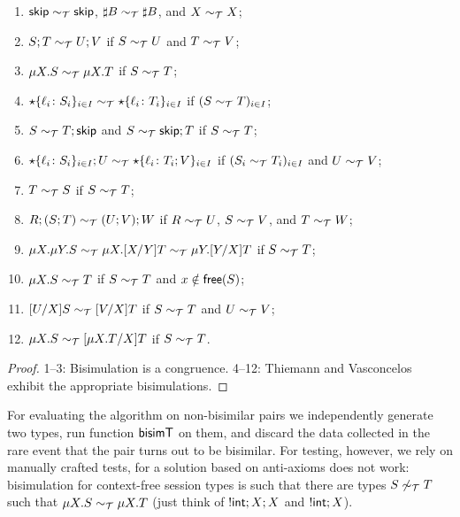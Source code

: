 \begin{theorem}
\label{thm:axioms}
  \begin{enumerate}
  \item $\mathsf{skip} \sim_\mathcal T \mathsf{skip}$,  $\sharp B \sim_\mathcal T \sharp B$, and
    $X \sim_\mathcal T X$;
  \item $S;T \sim_\mathcal T U;V$ if $S \sim_\mathcal T U$ and $T \sim_\mathcal T V$;
  \item $\mu X.S \sim_\mathcal T \mu X.T$ if $S \sim_\mathcal T T$;
  \item $\star\{\ell_i\colon S_i\}_{i\in I}\sim_\mathcal T
    \star\{\ell_i\colon T_i\}_{i\in I}$ if $(S \sim_\mathcal T T)_{i\in
      I}$;
  \item $S\sim_\mathcal T T;\mathsf{skip}$ and $S\sim_\mathcal T \mathsf{skip};T$ if $S \sim_\mathcal T T$;
  \item $\star\{\ell_i\colon S_i\}_{i\in I};U\sim_\mathcal T
    \star\{\ell_i\colon T_i;V\}_{i\in I}$ if $(S_i \sim_\mathcal T T_i)_{i\in
      I}$ and $U \sim_\mathcal T V$;
  \item $T \sim_\mathcal T S$ if $S \sim_\mathcal T T$;
  \item $R;(S;T) \sim_\mathcal T (U;V);W$ if $R \sim_\mathcal T U$, $S \sim_\mathcal T V$, and $T\sim_\mathcal T W$;
  \item
    $\mu X.\mu Y.S \sim_\mathcal T \mu X.[{X}/{Y}]T \sim_\mathcal T \mu Y.[{Y}/{X}]T$ if $S \sim_\mathcal T T$;
  \item $\mu X.S \sim_\mathcal T T$ if $S \sim_\mathcal T T$ and $x\notin\mathsf{free}(S)$;
  \item $[{U}/{X}]S\sim_\mathcal T [{V}/{X}]T$  if $S \sim_\mathcal T T$ and $U \sim_\mathcal T V$;
  \item $\mu X.S \sim_\mathcal T [{\mu X.T}/{X}]T$ if $S \sim_\mathcal T T$.
  \end{enumerate}
\end{theorem}
%
\begin{proof}
  1--3: Bisimulation is a congruence. 4--12: Thiemann and
  Vasconcelos~\cite{thiemann2016context} exhibit the appropriate
  bisimulations.
\end{proof}

For evaluating the algorithm on non-bisimilar pairs we independently
generate two types, run function $\mathsf{bisimT}$ on them, and discard the
data collected in the rare event that the pair turns out to be
bisimilar.
%
For testing, however, we rely on manually crafted tests, for a
solution based on anti-axioms does not work: bisimulation for
context-free session types is such that there are types $S \not\sim_\mathcal T
T$ such that $\mu X.S \sim_\mathcal T \mu X.T$ (just think of $!\mathsf{int};X;X$
and $!\mathsf{int};X$).

